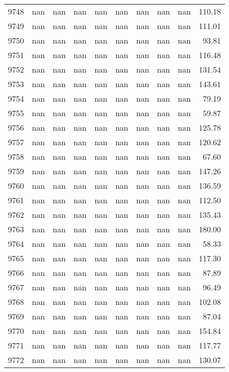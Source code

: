 \begin{tabular}{lrrrrrrrrr}
9748 & nan & nan & nan & nan & nan & nan & nan & nan & 110.18 \\
9749 & nan & nan & nan & nan & nan & nan & nan & nan & 111.01 \\
9750 & nan & nan & nan & nan & nan & nan & nan & nan & 93.81 \\
9751 & nan & nan & nan & nan & nan & nan & nan & nan & 116.48 \\
9752 & nan & nan & nan & nan & nan & nan & nan & nan & 131.54 \\
9753 & nan & nan & nan & nan & nan & nan & nan & nan & 143.61 \\
9754 & nan & nan & nan & nan & nan & nan & nan & nan & 79.19 \\
9755 & nan & nan & nan & nan & nan & nan & nan & nan & 59.87 \\
9756 & nan & nan & nan & nan & nan & nan & nan & nan & 125.78 \\
9757 & nan & nan & nan & nan & nan & nan & nan & nan & 120.62 \\
9758 & nan & nan & nan & nan & nan & nan & nan & nan & 67.60 \\
9759 & nan & nan & nan & nan & nan & nan & nan & nan & 147.26 \\
9760 & nan & nan & nan & nan & nan & nan & nan & nan & 136.59 \\
9761 & nan & nan & nan & nan & nan & nan & nan & nan & 112.50 \\
9762 & nan & nan & nan & nan & nan & nan & nan & nan & 135.43 \\
9763 & nan & nan & nan & nan & nan & nan & nan & nan & 180.00 \\
9764 & nan & nan & nan & nan & nan & nan & nan & nan & 58.33 \\
9765 & nan & nan & nan & nan & nan & nan & nan & nan & 117.30 \\
9766 & nan & nan & nan & nan & nan & nan & nan & nan & 87.89 \\
9767 & nan & nan & nan & nan & nan & nan & nan & nan & 96.49 \\
9768 & nan & nan & nan & nan & nan & nan & nan & nan & 102.08 \\
9769 & nan & nan & nan & nan & nan & nan & nan & nan & 87.04 \\
9770 & nan & nan & nan & nan & nan & nan & nan & nan & 154.84 \\
9771 & nan & nan & nan & nan & nan & nan & nan & nan & 117.77 \\
9772 & nan & nan & nan & nan & nan & nan & nan & nan & 130.07 \\

\end{tabular}
